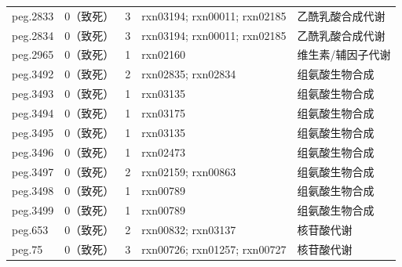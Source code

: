 \documentclass[10pt, a4paper, twocolumn]{ctexart}
\begin{document}
\begin{table}[htbp]
\begin{tabular}{llrp{4.5cm}p{5cm}}
peg.2833     & 0（致死） &  3 & rxn03194; rxn00011; rxn02185 & 乙酰乳酸合成代谢 \\
peg.2834     & 0（致死） &  3 & rxn03194; rxn00011; rxn02185 & 乙酰乳酸合成代谢 \\
peg.2965     & 0（致死） &  1 & rxn02160 & 维生素/辅因子代谢 \\
peg.3492     & 0（致死） &  2 & rxn02835; rxn02834 & 组氨酸生物合成 \\
peg.3493     & 0（致死） &  1 & rxn03135 & 组氨酸生物合成 \\
peg.3494     & 0（致死） &  1 & rxn03175 & 组氨酸生物合成 \\
peg.3495     & 0（致死） &  1 & rxn03135 & 组氨酸生物合成 \\
peg.3496     & 0（致死） &  1 & rxn02473 & 组氨酸生物合成 \\
peg.3497     & 0（致死） &  2 & rxn02159; rxn00863 & 组氨酸生物合成 \\
peg.3498     & 0（致死） &  1 & rxn00789 & 组氨酸生物合成 \\
peg.3499     & 0（致死） &  1 & rxn00789 & 组氨酸生物合成 \\
peg.653      & 0（致死） &  2 & rxn00832; rxn03137 & 核苷酸代谢 \\
peg.75       & 0（致死） &  3 & rxn00726; rxn01257; rxn00727 & 核苷酸代谢 \\
\bottomrule
\end{tabular}
\end{table}
\end{document}
